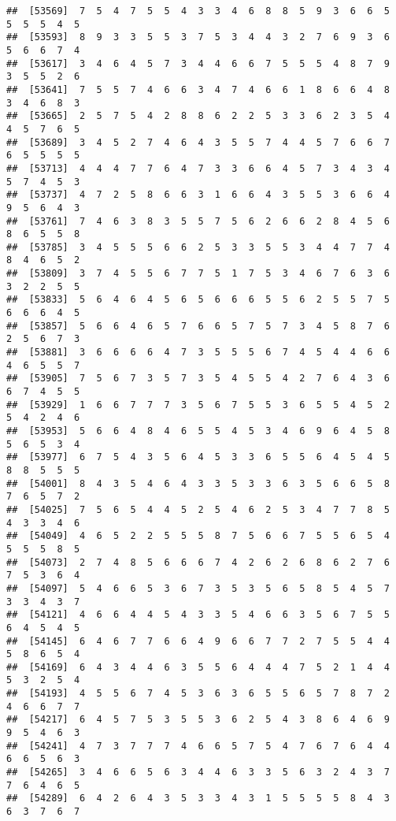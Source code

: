 \documentclass[
]{book}
\begin{document}
\begin{verbatim}
##  [53569]  7  5  4  7  5  5  4  3  3  4  6  8  8  5  9  3  6  6  5  5  5  5  4  5
##  [53593]  8  9  3  3  5  5  3  7  5  3  4  4  3  2  7  6  9  3  6  5  6  6  7  4
##  [53617]  3  4  6  4  5  7  3  4  4  6  6  7  5  5  5  4  8  7  9  3  5  5  2  6
##  [53641]  7  5  5  7  4  6  6  3  4  7  4  6  6  1  8  6  6  4  8  3  4  6  8  3
##  [53665]  2  5  7  5  4  2  8  8  6  2  2  5  3  3  6  2  3  5  4  4  5  7  6  5
##  [53689]  3  4  5  2  7  4  6  4  3  5  5  7  4  4  5  7  6  6  7  6  5  5  5  5
##  [53713]  4  4  4  7  7  6  4  7  3  3  6  6  4  5  7  3  4  3  4  5  7  4  5  3
##  [53737]  4  7  2  5  8  6  6  3  1  6  6  4  3  5  5  3  6  6  4  9  5  6  4  3
##  [53761]  7  4  6  3  8  3  5  5  7  5  6  2  6  6  2  8  4  5  6  8  6  5  5  8
##  [53785]  3  4  5  5  5  6  6  2  5  3  3  5  5  3  4  4  7  7  4  8  4  6  5  2
##  [53809]  3  7  4  5  5  6  7  7  5  1  7  5  3  4  6  7  6  3  6  3  2  2  5  5
##  [53833]  5  6  4  6  4  5  6  5  6  6  6  5  5  6  2  5  5  7  5  6  6  6  4  5
##  [53857]  5  6  6  4  6  5  7  6  6  5  7  5  7  3  4  5  8  7  6  2  5  6  7  3
##  [53881]  3  6  6  6  6  4  7  3  5  5  5  6  7  4  5  4  4  6  6  4  6  5  5  7
##  [53905]  7  5  6  7  3  5  7  3  5  4  5  5  4  2  7  6  4  3  6  6  7  4  5  5
##  [53929]  1  6  6  7  7  7  3  5  6  7  5  5  3  6  5  5  4  5  2  5  4  2  4  6
##  [53953]  5  6  6  4  8  4  6  5  5  4  5  3  4  6  9  6  4  5  8  5  6  5  3  4
##  [53977]  6  7  5  4  3  5  6  4  5  3  3  6  5  5  6  4  5  4  5  8  8  5  5  5
##  [54001]  8  4  3  5  4  6  4  3  3  5  3  3  6  3  5  6  6  5  8  7  6  5  7  2
##  [54025]  7  5  6  5  4  4  5  2  5  4  6  2  5  3  4  7  7  8  5  4  3  3  4  6
##  [54049]  4  6  5  2  2  5  5  5  8  7  5  6  6  7  5  5  6  5  4  5  5  5  8  5
##  [54073]  2  7  4  8  5  6  6  6  7  4  2  6  2  6  8  6  2  7  6  7  5  3  6  4
##  [54097]  5  4  6  6  5  3  6  7  3  5  3  5  6  5  8  5  4  5  7  3  3  4  3  7
##  [54121]  4  6  6  4  4  5  4  3  3  5  4  6  6  3  5  6  7  5  5  6  4  5  4  5
##  [54145]  6  4  6  7  7  6  6  4  9  6  6  7  7  2  7  5  5  4  4  5  8  6  5  4
##  [54169]  6  4  3  4  4  6  3  5  5  6  4  4  4  7  5  2  1  4  4  5  3  2  5  4
##  [54193]  4  5  5  6  7  4  5  3  6  3  6  5  5  6  5  7  8  7  2  4  6  6  7  7
##  [54217]  6  4  5  7  5  3  5  5  3  6  2  5  4  3  8  6  4  6  9  9  5  4  6  3
##  [54241]  4  7  3  7  7  7  4  6  6  5  7  5  4  7  6  7  6  4  4  6  6  5  6  3
##  [54265]  3  4  6  6  5  6  3  4  4  6  3  3  5  6  3  2  4  3  7  7  6  4  6  5
##  [54289]  6  4  2  6  4  3  5  3  3  4  3  1  5  5  5  5  8  4  3  6  3  7  6  7

\end{verbatim}
\end{document}
